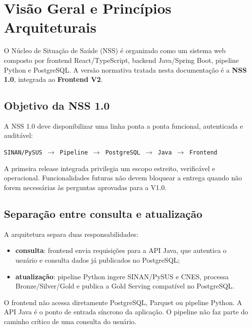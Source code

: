 \section{Visão Geral e Princípios Arquiteturais}

O Núcleo de Situação de Saúde (NSS) é organizado como um sistema web composto por frontend React/TypeScript, backend Java/Spring Boot, pipeline Python e PostgreSQL. A versão normativa tratada nesta documentação é a \textbf{NSS 1.0}, integrada ao \textbf{Frontend V2}.

\subsection{Objetivo da NSS 1.0}

A NSS 1.0 deve disponibilizar uma linha ponta a ponta funcional, autenticada e auditável:

\begin{center}
\texttt{SINAN/PySUS $\rightarrow$ Pipeline $\rightarrow$ PostgreSQL $\rightarrow$ Java $\rightarrow$ Frontend}
\end{center}

A primeira release integrada privilegia um escopo estreito, verificável e operacional. Funcionalidades futuras não devem bloquear a entrega quando não forem necessárias às perguntas aprovadas para a V1.0.

\subsection{Separação entre consulta e atualização}

A arquitetura separa duas responsabilidades:

\begin{itemize}
    \item \textbf{consulta}: frontend envia requisições para a API Java, que autentica o usuário e consulta dados já publicados no PostgreSQL;
    \item \textbf{atualização}: pipeline Python ingere SINAN/PySUS e CNES, processa Bronze/Silver/Gold e publica a Gold Serving compatível no PostgreSQL.
\end{itemize}

\begin{regra}
O frontend não acessa diretamente PostgreSQL, Parquet ou pipeline Python. A API Java é o ponto de entrada síncrono da aplicação. O pipeline não faz parte do caminho crítico de uma consulta do usuário.
\end{regra}

